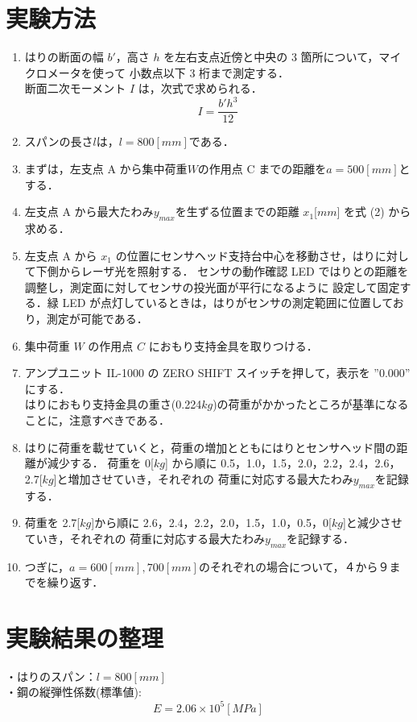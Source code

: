 \documentclass[a4paper,11pt]{jsarticle}
\begin{document}
\section{実験方法}
\begin{enumerate}
  \item はりの断面の幅 $b'$，高さ $h$ を左右支点近傍と中央の 3 箇所について，マイクロメータを使って
  小数点以下 3 桁まで測定する．\\
  \quad 断面二次モーメント $I$ は，次式で求められる．
  \begin{equation}
    I = {\dfrac{b'h^3}{12}}
  \end{equation}
  \item スパンの長さ$ l $は，$l= 800[mm] $である．
  \item まずは，左支点 A から集中荷重$ W $の作用点 C までの距離を$a = 500[mm] $とする．
  \item 左支点 A から最大たわみ$y_{max}$を生ずる位置までの距離 $x_1$[$mm$] を式 (2) から求める．
  \item 左支点 A から $x_1$ の位置にセンサヘッド支持台中心を移動させ，はりに対して下側からレーザ光を照射する．
  センサの動作確認 LED ではりとの距離を調整し，測定面に対してセンサの投光面が平行になるように
  設定して固定する．緑 LED が点灯しているときは，はりがセンサの測定範囲に位置しており，測定が可能である．
  \item  集中荷重 $W$ の作用点 $C$ におもり支持金具を取りつける．
  \item アンプユニット IL-1000 の ZERO SHIFT スイッチを押して，表示を ”0.000” にする．\\
  はりにおもり支持金具の重さ(0.224$kg$)の荷重がかかったところが基準になることに，注意すべきである．
  \item はりに荷重を載せていくと，荷重の増加とともにはりとセンサヘッド間の距離が減少する．
  荷重を 0[$kg$] から順に 0.5，1.0，1.5，2.0，2.2，2.4，2.6，2.7[$kg$]と増加させていき，それぞれの
  荷重に対応する最大たわみ$y_{max}$を記録する．
  \item 荷重を 2.7[$kg$]から順に 2.6，2.4，2.2，2.0，1.5，1.0，0.5，0[$kg$]と減少させていき，それぞれの
  荷重に対応する最大たわみ$y_{max}$を記録する．
  \item つぎに，$a= 600[mm],700[mm]$のそれぞれの場合について，４から９までを繰り返す．
\end{enumerate}

\section{実験結果の整理}
・はりのスパン：$l = 800[mm]$\\
\quad・鋼の縦弾性係数(標準値):
\begin{equation} 
  E = 2.06 \times 10^5 [MPa] 
\end{equation}
\end{document}
